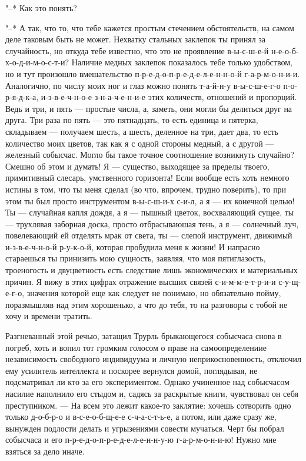 "--* Как это понять?

"--* А так, что то, что тебе кажется простым стечением
обстоятельств, на самом деле таковым быть не может. Нехватку
стальных заклепок ты принял за случайность, но откуда тебе
известно, что это не проявление в-ы-с-ш-е-й
н-е-о-б-х-о-д-и-м-о-с-т-и? Наличие медных заклепок
показалось тебе только удобством, но и тут произошло
вмешательство п-р-е-д-о-п-р-е-д-е-л-е-н-н-о-й
г-а-р-м-о-н-и-и. Аналогично, по числу моих ног и глаз можно
понять т-а-й-н-у в-ы-с-ш-е-г-о п-о-р-я-д-к-а,
и-з-в-е-ч-н-о-е з-н-а-ч-е-н-и-е этих количеств, отношений и
пропорций. Ведь и три, и пять --- простые числа, а, заметь, они
могли бы делиться друг на друга. Три раза по пять --- это
пятнадцать, то есть единица и пятерка, складываем --- получаем
шесть, а шесть, деленное на три, дает два, то есть
количество моих цветов, так как я с одной стороны медный, а
с другой --- железный собысчас. Могло бы такое точное
соотношение возникнуть случайно? Смешно об этом и думать! Я --- существо,
выходящее за пределы твоего, примитивный
слесарь, умственного горизонта! Если вообще есть хоть
немного истины в том, что ты меня сделал (во что, впрочем,
трудно поверить), то при этом ты был просто инструментом
в-ы-с-ш-и-х с-и-л, а я --- их конечной целью! Ты --- случайная
капля дождя, а я --- пышный цветок, восхваляющий сущее, ты --- трухлявая
заборная доска, просто отбрасываюшая тень, а я --- солнечный
луч, повелевающий ей отделять мрак от света, ты --- слепой
инструмент, движимый и-з-в-е-ч-н-о-й р-у-к-о-й,
которая пробудила меня к жизни! И напрасно стараешься ты
принизить мою сущность, заявляя, что моя пятиглазость,
троеногость и двуцветность есть следствие лишь экономических
и материальных причин. Я вижу в этих цифрах отражение высших
связей с-и-м-м-е-т-р-и-и с-у-щ-е-г-о, значения которой еще
как следует не понимаю, но обязательно пойму, поразмышляв
над этим хорошенько, а что до тебя, то на разговоры с тобой
не хочу и времени тратить.

Разгневанный этой речью, затащил Трурль брыкающегося
собысчаса снова в погреб, хоть и вопил тот громким голосом о
праве на самоопределениие независимость свободного
индивидуума и личную неприкосновенность, отключил ему
усилитель интеллекта и поскорее вернулся домой, поглядывая,
не подсматривал ли кто за его экспериментом. Однако
учиненное над собысчасом насилие наполнило его стыдом и,
садясь за раскрытые книги, чувствовал он себя преступником. --- На
всем это лежит какое-то заклятие: хочешь сотворить
одно только д-о-б-р-о и в-с-е-о-б-щ-е-е с-ч-а-с-т-ь-е, а
потом, или даже сразу же, вынужден подлости делать и
угрызениями совести мучаться. Черт бы побрал собысчаса и его
п-р-е-д-о-п-р-е-д-е-л-е-н-н-у-ю г-а-р-м-о-н-и-ю! Нужно мне
взяться за дело иначе.

